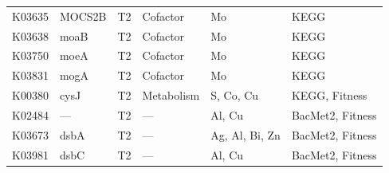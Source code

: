 \documentclass[11pt]{article}
\begin{document}
\begin{longtable}{@{}llllp{3.8cm}l@{}}
K03635 & MOCS2B & T2 & Cofactor & Mo & KEGG \\
K03638 & moaB & T2 & Cofactor & Mo & KEGG \\
K03750 & moeA & T2 & Cofactor & Mo & KEGG \\
K03831 & mogA & T2 & Cofactor & Mo & KEGG \\
\midrule
K00380 & cysJ & T2 & Metabolism & S, Co, Cu & KEGG, Fitness \\
\midrule
K02484 & --- & T2 & --- & Al, Cu & BacMet2, Fitness \\
K03673 & dsbA & T2 & --- & Ag, Al, Bi, Zn & BacMet2, Fitness \\
K03981 & dsbC & T2 & --- & Al, Cu & BacMet2, Fitness \\
\end{longtable}

\end{document}
